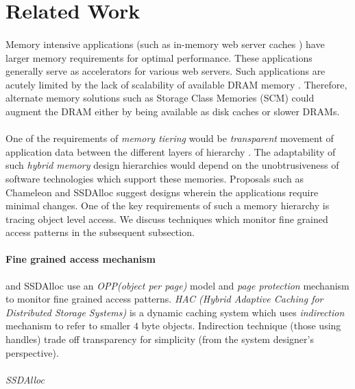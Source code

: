 \section{Related Work}
\paragraph{}
Memory intensive applications (such as in-memory web server caches \cite{}) have larger memory requirements for optimal performance. These applications generally serve as accelerators for various web servers. Such applications are acutely limited by the lack of scalability of available DRAM memory \cite{}. Therefore, alternate memory solutions such as Storage Class Memories (SCM) could augment the DRAM either by being available as disk caches or slower DRAMs. \cite{} %

\paragraph{}%
One of the requirements of {\emph{memory tiering}} would be {\emph{transparent}} movement of application data between the different layers of hierarchy \cite{Chameleon}. The adaptability of such {\emph{hybrid memory}} %
design hierarchies would depend on the unobtrusiveness of software technologies which support these memories. Proposals such as Chameleon {\cite{Chameleon}} and SSDAlloc {\cite{SSDAlloc}} suggest designs wherein the applications require minimal changes. One of the key requirements of such a memory hierarchy is tracing object level access. We discuss techniques which monitor fine grained access patterns in the subsequent subsection.

\paragraph{Fine grained access mechanism}
{\cite{Chameleon}} and SSDAlloc {\cite{SSDAlloc}} use an {\emph{OPP(object per page)}} model and {\emph{page protection}} mechanism to monitor fine grained access patterns. {\emph{HAC (Hybrid Adaptive Caching for Distributed Storage Systems)}} {\cite{HAC}} is a dynamic caching system which uses {\emph{indirection}} mechanism to refer to smaller $4$ byte objects. Indirection technique (those using handles) trade off transparency for simplicity (from the system designer's perspective).

\paragraph{}%
{\emph{SSDAlloc}}  


\paragraph{}%

\label{sec:related}

